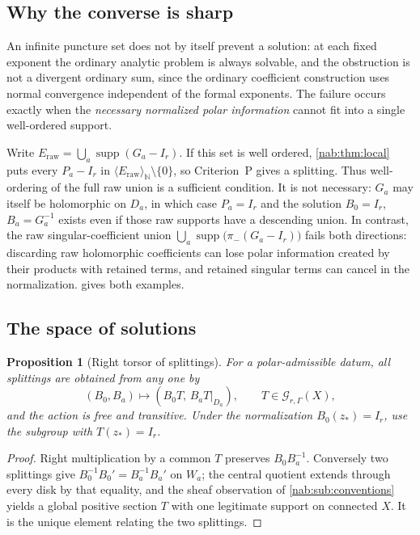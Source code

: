 \documentclass[11pt,letterpaper]{article}
\newtheorem{proposition}[proposition]{Proposition}
\theoremstyle{definition}
\theoremstyle{remark}
\newcommand{\N}{\mathbb N}
\newcommand{\GG}{\mathscr G_{r,\Gamma}}
\newcommand{\supp}{\operatorname{supp}}
\newcommand{\angles}[1]{\langle #1\rangle_{\N}}
\numberwithin{equation}{section}
\begin{document}
\subsection{Why the converse is sharp}

An infinite puncture set does not by itself prevent a solution: at each fixed
exponent the ordinary analytic problem is always solvable, and the obstruction
is not a divergent ordinary sum, since the ordinary coefficient construction
uses normal convergence independent of the formal exponents. The failure occurs
exactly when the \emph{necessary normalized polar information} cannot fit into
a single well-ordered support.

Write $E_{\mathrm{raw}}=\bigcup_a\supp(G_a-I_r)$. If this set is well
ordered, \cref{nab:thm:local} puts every $P_a-I_r$ in
$\angles{E_{\mathrm{raw}}}\setminus\{0\}$, so Criterion~P gives a splitting.
Thus well-ordering of the full raw union is a sufficient condition. It is
not necessary: $G_a$ may itself be holomorphic on $D_a$, in which case
$P_a=I_r$ and the solution
$B_0=I_r$, $B_a=G_a^{-1}$ exists even if those raw supports have a descending
union. In contrast, the raw singular-coefficient union
$\bigcup_a\supp\bigl(\pi_-(G_a-I_r)\bigr)$ fails both directions:
discarding raw holomorphic coefficients can lose polar information created
by their products with retained terms, and retained singular terms can cancel
in the normalization.  gives both examples.

\subsection{The space of solutions}

\begin{proposition}[Right torsor of splittings]\label{nab:prop:torsor}
For a polar-admissible datum, all splittings are obtained from any one by
\[
 (B_0,B_a)\longmapsto(B_0T,\,B_aT|_{D_a}),\qquad T\in\GG(X),
\]
and the action is free and transitive. Under the normalization $B_0(z_*)=I_r$,
use the subgroup with $T(z_*)=I_r$.
\end{proposition}

\begin{proof}
Right multiplication by a common $T$ preserves $B_0B_a^{-1}$. Conversely two
splittings give $B_0^{-1}B_0'=B_a^{-1}B_a'$ on $W_a$; the central quotient
extends through every disk by that equality, and the sheaf observation of
\cref{nab:sub:conventions} yields a global positive section $T$ with one
legitimate support on connected $X$. It is the unique element relating the two
splittings.
\end{proof}
\end{document}
